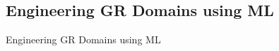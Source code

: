 \documentclass[usenames,dvipsnames]{beamer}
\begin{document}
%
%
%
%

\subsection{Engineering GR Domains using ML}

\begin{frame}[c]
	\begin{center}
		\Large{Engineering GR Domains using ML}
	\end{center}
\end{frame}
\end{document}

